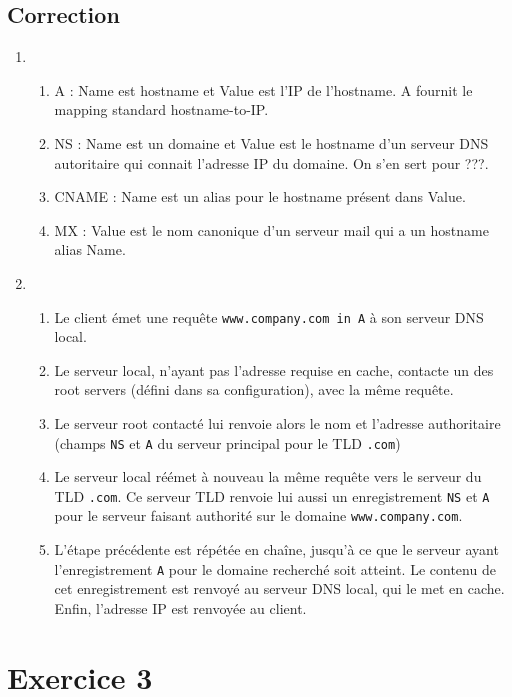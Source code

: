 \documentclass[a4paper, 11pt, titlepage]{article}
\begin{document}
\subsection{Correction}
\begin{enumerate}[label=(\alph*)]
  \item
  \begin{enumerate}[label=(\roman*)]
    \item A : Name est hostname et Value est l'IP de l'hostname. A fournit le mapping standard hostname-to-IP.
    \item NS : Name est un domaine et Value est le hostname d'un serveur DNS autoritaire qui connait l'adresse IP du domaine. On s'en sert pour ???.
    \item CNAME : Name est un alias pour le hostname présent dans Value.
    \item MX : Value est le nom canonique d'un serveur mail qui a un hostname alias Name.
  \end{enumerate}

  \item
  \begin{enumerate}
    \item Le client émet une requête \texttt{www.company.com in A} à son serveur DNS local. 
    \item Le serveur local, n'ayant pas l'adresse requise en cache, contacte un des root servers (défini dans sa configuration), avec la même requête.
    \item Le serveur root contacté lui renvoie alors le nom et l'adresse authoritaire (champs \texttt{NS} et \texttt{A} du serveur principal pour le TLD \texttt{.com})
    \item Le serveur local réémet à nouveau la même requête vers le serveur du TLD \texttt{.com}. Ce serveur TLD renvoie lui aussi un enregistrement \texttt{NS} et \texttt{A} pour le serveur faisant authorité sur le domaine \texttt{www.company.com}.
    \item L'étape précédente est répétée en chaîne, jusqu'à ce que le serveur ayant l'enregistrement \texttt{A} pour le domaine recherché soit atteint. Le contenu de cet enregistrement est renvoyé au serveur DNS local, qui le met en cache. Enfin, l'adresse IP est renvoyée au client.
  \end{enumerate}

\end{enumerate}



\section{Exercice 3}
\end{document}
